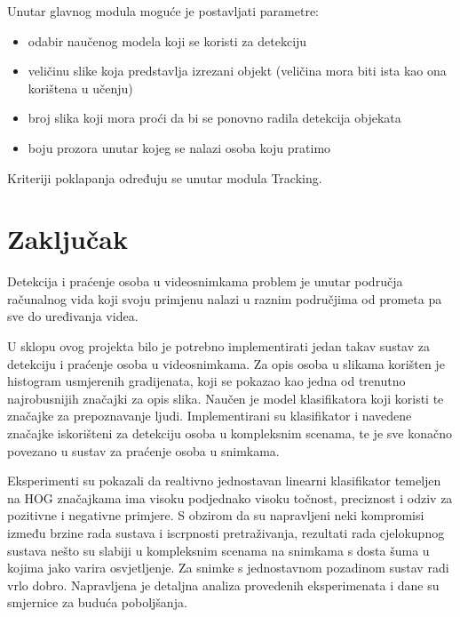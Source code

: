 \documentclass[times, utf8, seminar, numeric]{fer}
\begin{document}
Unutar glavnog modula moguće je postavljati parametre:
\begin{itemize}
	\item odabir naučenog modela koji se koristi za detekciju
	\item veličinu slike koja predstavlja izrezani objekt (veličina mora biti ista kao ona korištena u učenju)
	\item broj slika koji mora proći da bi se ponovno radila detekcija objekata
	\item boju prozora unutar kojeg se nalazi osoba koju pratimo
\end{itemize}

Kriteriji poklapanja određuju se unutar modula Tracking.


\chapter{Zaključak}
Detekcija i praćenje osoba u videosnimkama problem je unutar područja računalnog vida koji svoju primjenu nalazi u raznim područjima od prometa pa sve do uređivanja videa.

U sklopu ovog projekta bilo je potrebno implementirati jedan takav sustav za detekciju i praćenje osoba u videosnimkama. Za opis osoba u slikama korišten je histogram usmjerenih gradijenata, koji se pokazao kao jedna od trenutno najrobusnijih značajki za opis slika. Naučen je model klasifikatora koji koristi te značajke za prepoznavanje ljudi. Implementirani su klasifikator i navedene značajke iskorišteni za detekciju osoba u kompleksnim scenama, te je sve konačno povezano u sustav za praćenje osoba u snimkama.

Eksperimenti su pokazali da realtivno jednostavan linearni klasifikator temeljen na HOG značajkama ima visoku podjednako visoku točnost, preciznost i odziv za pozitivne i negativne primjere. S obzirom da su napravljeni neki kompromisi između brzine rada sustava i iscrpnosti pretraživanja, rezultati rada cjelokupnog sustava nešto su slabiji u kompleksnim scenama na snimkama s dosta šuma u kojima jako varira osvjetljenje. Za snimke s jednostavnom pozadinom sustav radi vrlo dobro. Napravljena je detaljna analiza provedenih eksperimenata i dane su smjernice za buduća poboljšanja.



\end{document}
